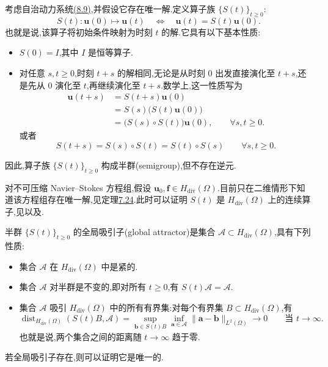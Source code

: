\begin{note}[描述动力系统演化的一族算子]
\label{note:dynamical-system-semigroup}\label{note:semigroup-method}
考虑自治动力系统\hyperref[eq:dynamical-system-abstract]{(8.9)},并假设它存在唯一解.定义算子族 $\{S(t)\}_{t\ge0}$:
\[
 S(t):\bm{u}(0)\mapsto\bm{u}(t)
 \quad\Longleftrightarrow\quad
 \bm{u}(t)=S(t)\bm{u}(0).
\]
也就是说,该算子将初始条件映射为时刻 $t$ 的解.它具有以下基本性质:
\begin{itemize}
 \item $S(0)=I$,其中 $I$ 是恒等算子.
 \item 对任意 $s,t\ge0$,时刻 $t+s$ 的解相同,无论是从时刻 $0$ 出发直接演化至 $t+s$,还是先从 $0$ 演化至 $t$,再继续演化至 $t+s$.数学上,这一性质写为
  \[
  \begin{aligned}
   \bm{u}(t+s)&=S(t+s)\bm{u}(0)\\
    &=S(s)\bigl(S(t)\bm{u}(0)\bigr)\\
    &=\bigl(S(s)\circ S(t)\bigr)\bm{u}(0),
      \qquad\forall s,t\ge0.
  \end{aligned}
  \]
 或者
 \[
  S(t+s)=S(s)\circ S(t)=S(t)\circ S(s)
   \qquad\forall s,t\ge0.
 \]
\end{itemize}
因此,算子族 $\{S(t)\}_{t\ge0}$ 构成半群(semigroup),但不存在逆元.
\end{note}

\begin{note}
\label{note:navier-stokes-dynamical-system-setup}
对不可压缩 Navier--Stokes 方程组,假设 $\bm{u}_0,\bm{f}\in H_{\mathrm{div}}(\Omega)$.目前只在二维情形下知道该方程组存在唯一解,见定理\hyperref[thm:time-dependent-two-dimensional-uniqueness]{7.24}.此时可以证明 $S(t)$ 是 $H_{\mathrm{div}}(\Omega)$ 上的连续算子,见\textcite[p.~554]{MarionTemam1998}以及\textcite[p.~138]{FoiasManleyRosaTemam2001}.
\end{note}

\begin{note}[全局吸引子]
\label{note:global-attractor}
半群 $\{S(t)\}_{t\ge0}$ 的全局吸引子(global attractor)是集合 $\mathcal{A}\subset H_{\mathrm{div}}(\Omega)$,具有下列性质:
\begin{itemize}
 \item 集合 $\mathcal{A}$ 在 $H_{\mathrm{div}}(\Omega)$ 中是紧的.
 \item 集合 $\mathcal{A}$ 对半群是不变的,即对所有 $t\ge0$,有 $S(t)\mathcal{A}=\mathcal{A}$.
 \item 集合 $\mathcal{A}$ 吸引 $H_{\mathrm{div}}(\Omega)$ 中的所有有界集:对每个有界集 $B\subset H_{\mathrm{div}}(\Omega)$,有
 \[
  \operatorname{dist}_{H_{\mathrm{div}}(\Omega)}(S(t)B,\mathcal{A})
   =\sup_{\bm{b}\in S(t)B}\inf_{\bm{a}\in\mathcal{A}}
      \|\bm{a}-\bm{b}\|_{L^2(\Omega)}
   \longrightarrow0
   \qquad\text{当 }t\to\infty.
 \]
 也就是说,两个集合之间的距离随 $t\to\infty$ 趋于零.
\end{itemize}
若全局吸引子存在,则可以证明它是唯一的.
\end{note}

